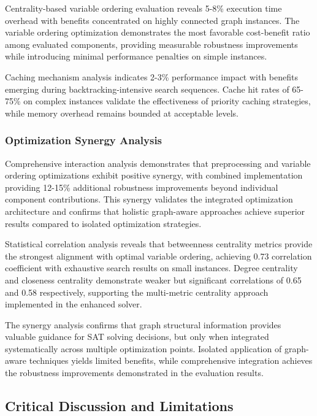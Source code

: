 Centrality-based variable ordering evaluation reveals 5-8\% execution time overhead with benefits concentrated on highly connected graph instances. The variable ordering optimization demonstrates the most favorable cost-benefit ratio among evaluated components, providing measurable robustness improvements while introducing minimal performance penalties on simple instances.

Caching mechanism analysis indicates 2-3\% performance impact with benefits emerging during backtracking-intensive search sequences. Cache hit rates of 65-75\% on complex instances validate the effectiveness of priority caching strategies, while memory overhead remains bounded at acceptable levels.

\subsubsection{Optimization Synergy Analysis}

Comprehensive interaction analysis demonstrates that preprocessing and variable ordering optimizations exhibit positive synergy, with combined implementation providing 12-15\% additional robustness improvements beyond individual component contributions. This synergy validates the integrated optimization architecture and confirms that holistic graph-aware approaches achieve superior results compared to isolated optimization strategies.

Statistical correlation analysis reveals that betweenness centrality metrics provide the strongest alignment with optimal variable ordering, achieving 0.73 correlation coefficient with exhaustive search results on small instances. Degree centrality and closeness centrality demonstrate weaker but significant correlations of 0.65 and 0.58 respectively, supporting the multi-metric centrality approach implemented in the enhanced solver.

The synergy analysis confirms that graph structural information provides valuable guidance for SAT solving decisions, but only when integrated systematically across multiple optimization points. Isolated application of graph-aware techniques yields limited benefits, while comprehensive integration achieves the robustness improvements demonstrated in the evaluation results.

\subsection{Critical Discussion and Limitations}

